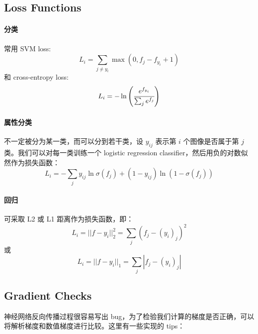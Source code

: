 \subsection{Loss Functions}

\paragraph{分类}

常用 SVM loss:
\[
L_i=\sum_{j\neq y_i}\max(0,f_j-f_{y_i}+1)
\]
和 cross-entropy loss:
\[
L_i=-\ln\left(\cfrac{e^{f_{y_i}}}{\sum_je^{f_j}}\right)
\]

\paragraph{属性分类}

不一定被分为某一类，而可以分到若干类，设 $y_{ij}$ 表示第 $i$ 个图像是否属于第 $j$ 类。我们可以对每一类训练一个 logistic regression classifier，然后用负的对数似然作为损失函数：
\[
L_i=-\sum_j y_{ij}\ln\sigma(f_j)+(1-y_{ij})\ln(1-\sigma(f_j))
\]

\paragraph{回归}

可采取 L2 或 L1 距离作为损失函数，即：
\[
L_i=||f-y_i||_2^2=\sum_j(f_j-(y_{i})_j)^2
\]
或
\[
L_i=||f-y_i||_1=\sum_j|f_j-(y_i)_j|
\]

\subsection{Gradient Checks}

神经网络反向传播过程很容易写出 bug，为了检验我们计算的梯度是否正确，可以将解析梯度和数值梯度进行比较。这里有一些实现的 tips：

